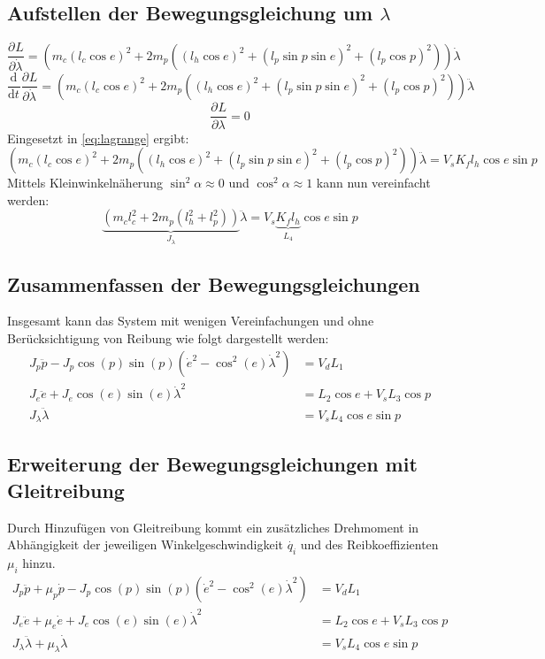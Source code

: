 \documentclass{article}
\newcommand{\partiell}[3][]{\frac{\partial^{#1}#2}{\partial{#3}^{#1}}}
\newcommand{\diff}[3][]{\frac{\mathrm{d}^{#1}#2}{\mathrm{d}{#3}^{#1}}}
\begin{document}
	\subsection{Aufstellen der Bewegungsgleichung um $\lambda$}
	\begin{equation}
	\partiell{L}{\dot{\lambda}} = (m_c (l_c \cos e)^2
	+ 2 m_p((l_h \cos e)^2 + (l_p \sin p \sin e)^2+(l_p \cos p)^2))\dot{\lambda}
	\end{equation}
	\begin{equation}
	\diff{}{t}\partiell{L}{\dot{\lambda}} = (m_c (l_c \cos e)^2
	+ 2 m_p((l_h \cos e)^2 + (l_p \sin p \sin e)^2+(l_p \cos p)^2))\ddot{\lambda}
	\end{equation}
	\begin{equation}
	\partiell{L}{\lambda} = 0
	\end{equation}
	Eingesetzt in \eqref{eq:lagrange} ergibt:
	\begin{equation}
	(m_c (l_c \cos e)^2
	+ 2 m_p((l_h \cos e)^2 + (l_p \sin p \sin e)^2+(l_p \cos p)^2))\ddot{\lambda} = V_s K_f l_h \cos e \sin p
	\end{equation}
	Mittels Kleinwinkelnäherung $\sin^2 \alpha \approx 0$ und $\cos^2 \alpha \approx 1$  kann nun vereinfacht werden:
	\begin{equation}
	\underbrace{(m_c l_c^2 +  2 m_p(l_h^2 + l_p^2))}_{J_\lambda} \ddot{\lambda} = V_s \underbrace{K_f l_h}_{L_4} \cos e \sin p
	\end{equation}
	\subsection{Zusammenfassen der Bewegungsgleichungen}
	Insgesamt kann das System mit wenigen Vereinfachungen und ohne Berücksichtigung von Reibung wie folgt dargestellt werden:
	\begin{align}
	J_p \ddot{p} - J_p \cos (p) \sin (p) (\dot{e}^2- \cos^2 (e) \dot{\lambda}^2) &= V_d L_1\\
	J_e\ddot{e} + J_e \cos (e) \sin (e) \dot{\lambda}^2 
	&= L_2 \cos e + V_s L_3 \cos p\\
	J_\lambda \ddot{\lambda} &= V_s L_4 \cos e \sin p
	\end{align}
	\subsection{Erweiterung der Bewegungsgleichungen mit Gleitreibung}
	Durch Hinzufügen von Gleitreibung kommt ein zusätzliches Drehmoment in Abhängigkeit der jeweiligen Winkelgeschwindigkeit $\dot{q_i}$ und des Reibkoeffizienten $\mu_i$  hinzu.
	\begin{align}
	J_p \ddot{p} + \mu_p \dot{p} - J_p \cos (p) \sin (p) (\dot{e}^2- \cos^2 (e) \dot{\lambda}^2) &= V_d L_1\\
	J_e\ddot{e} + \mu_e \dot{e} + J_e \cos (e) \sin (e) \dot{\lambda}^2 
	&= L_2 \cos e + V_s L_3 \cos p\\
	J_\lambda \ddot{\lambda} + \mu_\lambda \dot{\lambda} &= V_s L_4 \cos e \sin p
	\end{align}
\end{document}
